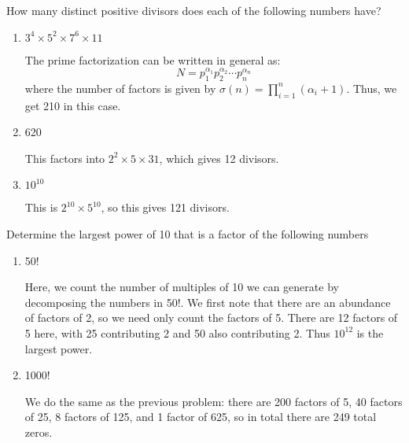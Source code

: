 \documentclass[10pt]{article}
\begin{document}
	\begin{problem}
		How many distinct positive divisors does each of the following numbers have?
		\begin{enumerate}[label=(\alph*)]
			\item \( 3^{4} \times 5^2 \times 7^{6} \times 11 \)

				\begin{solution}
					The prime factorization can be written in general as:
					\[
						N = p_1^{\alpha_1} p_2^{\alpha_2} \cdots p_n^{\alpha_n}
					\]
					where the number of factors is given by \( \sigma(n) = \prod_{i = 1}^{n}(\alpha_i + 1)
					\). Thus, we get 210 in this case. 
				\end{solution}
			\item 620

				\begin{solution}
					This factors into \( 2^2 \times 5 \times 31 \), which gives 12 divisors. 
				\end{solution}
			\item \( 10^{10} \)

				\begin{solution}
					This is \( 2^{10} \times 5^{10} \), so this gives 121 divisors. 
				\end{solution}
		\end{enumerate}
	\end{problem}

	\begin{problem}
		Determine the largest power of 10 that is a factor of the following numbers
		\begin{enumerate}[label=(\alph*)]
			\item 50!

				\begin{solution}
					Here, we count the number of multiples of 10 we can generate by decomposing the numbers
					in 50!. We first note that there are an abundance of factors of 2, so we need only count
					the factors of 5. There are 12 factors of 5 here, with 25 contributing 2 and 50 also
					contributing 2. Thus \( 10^{12} \) is the largest power. 
				\end{solution}
			\item 1000!

				\begin{solution}
					We do the same as the previous problem: there are 200 factors of 5, 40 factors of 25, 8
					factors of 125, and 1 factor of 625, so in total there are 249 total zeros.
				\end{solution}
		\end{enumerate}
	\end{problem}
\end{document}

